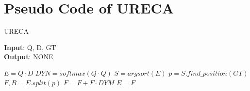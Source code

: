 \section{Pseudo Code of URECA}
\begin{algorithm}
\caption{URECA}
\label{alg:algorithm}
\textbf{Input}:  Q, D, GT \\
\textbf{Output}: NONE
\begin{algorithmic}[1]
\State $E=Q \cdot D$
\State $DYN=softmax(Q \cdot Q)$
\State $S = argsort(E)$
\State $p = S.find\_position(GT)$
\State $F, B = E.split(p)$
\State $F = F + F \cdot DYM $
\State $E=F$
\EndFor
\end{algorithmic}
\end{algorithm}






